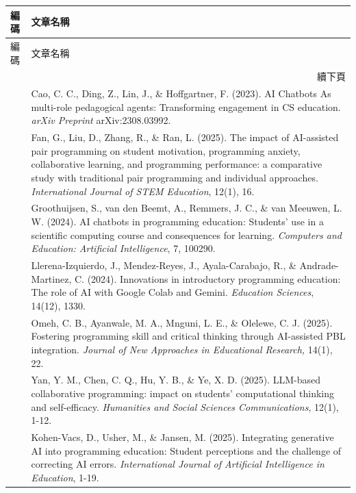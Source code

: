 \begingroup
\small
\setlength{\tabcolsep}{3pt}
\begin{longtable}{@{}p{} p{}@{}}
\toprule
編碼 & 文章名稱 \\
\midrule
\endfirsthead
\toprule
編碼 & 文章名稱 \\
\midrule
\endhead
\midrule
\multicolumn{2}{r}{續下頁} \\
\endfoot
\bottomrule
\endlastfoot
\cite{cao2023chatbots} & Cao, C. C., Ding, Z., Lin, J., \& Hoffgartner, F. (2023). AI Chatbots As multi-role pedagogical agents: Transforming engagement in CS education. \textit{arXiv Preprint} arXiv:2308.03992. \\
\cite{fan2025pair} & Fan, G., Liu, D., Zhang, R., \& Ran, L. (2025). The impact of AI-assisted pair programming on student motivation, programming anxiety, collaborative learning, and programming performance: a comparative study with traditional pair programming and individual approaches. \textit{International Journal of STEM Education}, 12(1), 16. \\
\cite{groothuijsen2024chatbots} & Groothuijsen, S., van den Beemt, A., Remmers, J. C., \& van Meeuwen, L. W. (2024). AI chatbots in programming education: Students' use in a scientific computing course and consequences for learning. \textit{Computers and Education: Artificial Intelligence}, 7, 100290. \\
\cite{llerena2024introductory} & Llerena-Izquierdo, J., Mendez-Reyes, J., Ayala-Carabajo, R., \& Andrade-Martinez, C. (2024). Innovations in introductory programming education: The role of AI with Google Colab and Gemini. \textit{Education Sciences}, 14(12), 1330. \\
\cite{omeh2025pbl} & Omeh, C. B., Ayanwale, M. A., Mnguni, L. E., \& Olelewe, C. J. (2025). Fostering programming skill and critical thinking through AI-assisted PBL integration. \textit{Journal of New Approaches in Educational Research,} 14(1), 22. \\
\cite{yan2025llm} & Yan, Y. M., Chen, C. Q., Hu, Y. B., \& Ye, X. D. (2025). LLM-based collaborative programming: impact on students' computational thinking and self-efficacy. \textit{Humanities and Social Sciences Communications}, 12(1), 1-12. \\
\cite{kohen2025integrating} & Kohen-Vacs, D., Usher, M., \& Jansen, M. (2025). Integrating generative AI into programming education: Student perceptions and the challenge of correcting AI errors. \textit{International Journal of Artificial Intelligence in Education}, 1-19. \\

\end{longtable}
